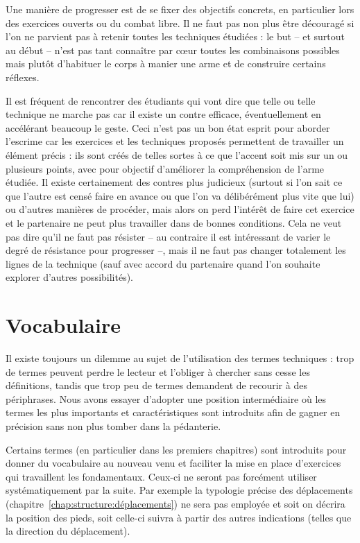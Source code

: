 
Une manière de progresser est de se fixer des objectifs concrets, en particulier lors des exercices ouverts ou du combat libre.
Il ne faut pas non plus être découragé si l'on ne parvient pas à retenir toutes les techniques étudiées : le but -- et surtout au début -- n'est pas tant connaître par cœur toutes les combinaisons possibles mais plutôt d'habituer le corps à manier une arme et de construire certains réflexes.

Il est fréquent de rencontrer des étudiants qui vont dire que telle ou telle technique ne marche pas car il existe un contre efficace, éventuellement en accélérant beaucoup le geste.
Ceci n'est pas un bon état esprit pour aborder l'escrime car les exercices et les techniques proposés permettent de travailler un élément précis : ils sont créés de telles sortes à ce que l'accent soit mis sur un ou plusieurs points, avec pour objectif d'améliorer la compréhension de l'arme étudiée.
Il existe certainement des contres plus judicieux (surtout si l'on sait ce que l'autre est censé faire en avance ou que l'on va délibérément plus vite que lui) ou d'autres manières de procéder, mais alors on perd l'intérêt de faire cet exercice et le partenaire ne peut plus travailler dans de bonnes conditions.
Cela ne veut pas dire qu'il ne faut pas résister – au contraire il est intéressant de varier le degré de résistance pour progresser –, mais il ne faut pas changer totalement les lignes de la technique (sauf avec accord du partenaire quand l'on souhaite explorer d'autres possibilités).


\section{Vocabulaire}


Il existe toujours un dilemme au sujet de l'utilisation des termes techniques : trop de termes peuvent perdre le lecteur et l'obliger à chercher sans cesse les définitions, tandis que trop peu de termes demandent de recourir à des périphrases.
Nous avons essayer d'adopter une position intermédiaire où les termes les plus importants et caractéristiques sont introduits afin de gagner en précision sans non plus tomber dans la pédanterie.

Certains termes (en particulier dans les premiers chapitres) sont introduits pour donner du vocabulaire au nouveau venu et faciliter la mise en place d'exercices qui travaillent les fondamentaux.
Ceux-ci ne seront pas forcément utiliser systématiquement par la suite.
Par exemple la typologie précise des déplacements (chapitre~\ref{chap:structure:déplacements}) ne sera pas employée et soit on décrira la position des pieds, soit celle-ci suivra à partir des autres indications (telles que la direction du déplacement).

